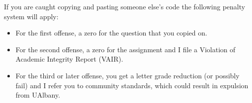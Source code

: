 \documentclass[a4paper,10pt]{article}
\begin{document}
If you are caught copying and pasting someone else’s code the following penalty system will apply:
\begin{itemize}
\item For the first offense, a zero for the question that you copied on.
\item For the second offense, a zero for the assignment and I file a Violation of Academic Integrity Report (VAIR).
\item For the third or later offense, you get a letter grade reduction (or possibly fail) and I refer you to community standards, which could result in expulsion from UAlbany.
\end{itemize}
\end{document}
